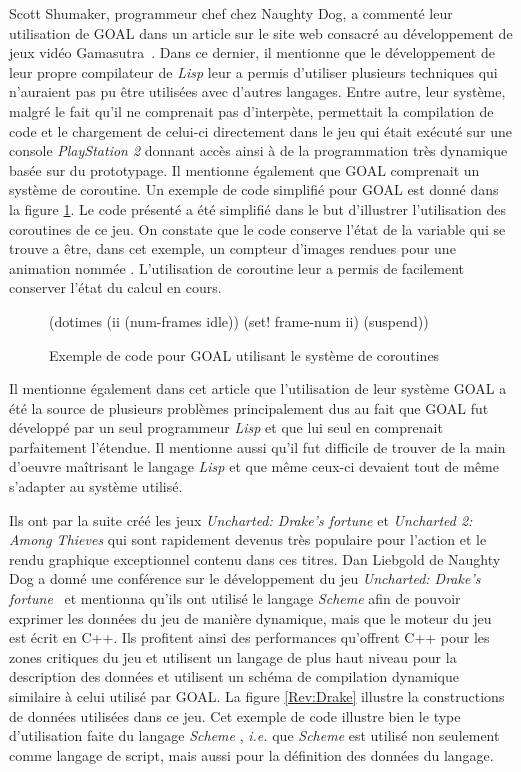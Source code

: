 \documentclass[12pt,twoside,letterpaper,francais]{book}
\newcommand{\ie}{{\textit{i.e. }}}
\newcommand{\lisp}{{\textit{Lisp }}}
\newcommand{\Schemelang}{{\textit{Scheme }}}
\newcommand{\scheme}[1]{\selectlanguage{english}{\tt #1}\selectlanguage{french}}
\begin{document}
Scott Shumaker, programmeur chef chez Naughty Dog, a commenté leur
utilisation de GOAL dans un article sur le site web consacré au
développement de jeux vidéo Gamasutra~\cite{ND_GOAL}. Dans ce dernier,
il mentionne que le développement de leur propre compilateur de \lisp
leur a permis d'utiliser plusieurs techniques qui n'auraient pas pu
être utilisées avec d'autres langages. Entre autre, leur système,
malgré le fait qu'il ne comprenait pas d'interpète, permettait la
compilation de code et le chargement de celui-ci directement dans le
jeu qui était exécuté sur une console \textit{PlayStation 2} donnant
accès ainsi à de la programmation très dynamique basée sur du
prototypage. Il mentionne également que GOAL comprenait un système de
coroutine. Un exemple de code simplifié pour GOAL est donné dans la
figure \ref{Rev:goal}. Le code présenté a été simplifié dans le but
d'illustrer l'utilisation des coroutines de ce jeu. On constate que le
code conserve l'état de la variable \scheme{ii} qui se trouve a être,
dans cet exemple, un compteur d'images rendues pour une animation
nommée \scheme{idle}. L'utilisation de coroutine leur a permis de
facilement conserver l'état du calcul en cours.

\begin{figure}[htb!]
  \begin{schemecode}
(dotimes (ii (num-frames idle))
  (set! frame-num ii)
  (suspend))
  \end{schemecode}
  \caption{Exemple de code pour GOAL utilisant le système de coroutines}
  \label{Rev:goal}
\end{figure}

Il mentionne également dans cet article que l'utilisation de leur
système GOAL a été la source de plusieurs problèmes principalement dus
au fait que GOAL fut développé par un seul programmeur \lisp et que lui
seul en comprenait parfaitement l'étendue. Il mentionne aussi qu'il
fut difficile de trouver de la main d'oeuvre maîtrisant le langage
\lisp et que même ceux-ci devaient tout de même s'adapter au système
utilisé.

Ils ont par la suite créé les jeux \textit{Uncharted: Drake's fortune}
et \textit{Uncharted 2: Among Thieves} qui sont rapidement devenus
très populaire pour l'action et le rendu graphique exceptionnel
contenu dans ces titres. Dan Liebgold de Naughty Dog a donné une
conférence sur le développement du jeu \textit{Uncharted: Drake's
  fortune}~\cite{ND_DRAKE} et mentionna qu'ils ont utilisé le langage
\Schemelang afin de pouvoir exprimer les données du jeu de manière
dynamique, mais que le moteur du jeu est écrit en C++. Ils profitent
ainsi des performances qu'offrent C++ pour les zones critiques du jeu
et utilisent un langage de plus haut niveau pour la description des
données et utilisent un schéma de compilation dynamique similaire à
celui utilisé par GOAL. La figure \ref{Rev:Drake} illustre la
constructions de données utilisées dans ce jeu. Cet exemple de code
illustre bien le type d'utilisation faite du langage \Schemelang, \ie que
\Schemelang est utilisé non seulement comme langage de script, mais aussi
pour la définition des données du langage.
\end{document}
